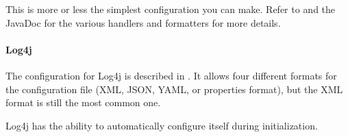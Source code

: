 \documentclass[11pt,a4paper, titlepage, parskip=half, headsepline, footsepline, cleardoublepage=current, headheight=1cm]{scrbook}
\begin{document}
This is more or less the simplest configuration you can make. Refer to \autocite{ORACLE_DOC_LOGGING_OVERVIEW, ORACLE_DOC_LOGGING_PACKAGE, ORACLE_DOC_LOGMANAGER_CLASS} and the JavaDoc for the various handlers and formatters for more details.


\paragraph{Log4j} The configuration for Log4j is described in \autocite{APACHE_LOG4J:Configuration}. It allows four different formats for the configuration file (XML, JSON, YAML, or properties format), but the XML format is still the most common one.

Log4j has the ability to automatically configure itself during initialization. 
\end{document}
